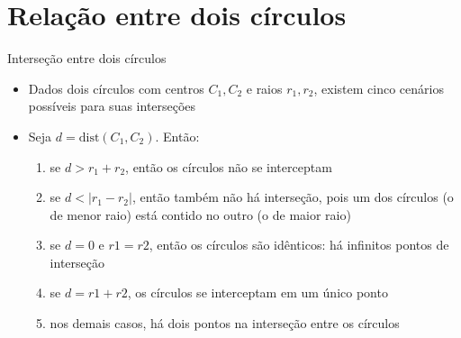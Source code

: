 \section{Relação entre dois círculos}

\begin{frame}[fragile]{Interseção entre dois círculos}

    \begin{itemize}
        \item Dados dois círculos com centros $C_1, C_2$ e raios $r_1, r_2$, existem cinco 
        cenários possíveis para suas interseções 

        \item Seja $d = \mathrm{dist}(C_1, C_2)$. Então:

        \begin{enumerate}
            \item se $d > r_1 + r_2$, então os círculos não se interceptam
            \item se $d < |r_1 - r_2|$, então também não há interseção, pois um dos círculos 
                (o de menor raio) está contido no outro (o de maior raio)
            \item se $d = 0$ e $r1 = r2$, então os círculos são idênticos: há infinitos pontos de 
                interseção
            \item se $d = r1 + r2$, os círculos se interceptam em um único ponto
            \item nos demais casos, há dois pontos na interseção entre os círculos
        \end{enumerate}

    \end{itemize}

\end{frame}

